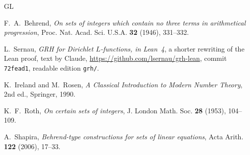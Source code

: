 \documentclass[reqno]{amsart}
\theoremstyle{definition}
\theoremstyle{plain}
\begin{document}
\begin{thebibliography}{GL}

F.~A.~Behrend, \emph{On sets of integers which contain no three terms in arithmetical progression}, Proc. Nat. Acad. Sci. U.S.A. \textbf{32} (1946), 331--332.

 L.~Sernau, \emph{GRH for Dirichlet \(L\)-functions, in Lean~4}, a shorter rewriting of the Lean proof, text by Claude, \url{https://github.com/lsernau/grh-lean}, commit \texttt{72fead1}, readable edition \texttt{grh/}.

K.~Ireland and M.~Rosen, \emph{A Classical Introduction to Modern Number Theory}, 2nd ed., Springer, 1990.

K.~F.~Roth, \emph{On certain sets of integers}, J. London Math. Soc. \textbf{28} (1953), 104--109.

A.~Shapira, \emph{Behrend-type constructions for sets of linear equations}, Acta Arith. \textbf{122} (2006), 17--33.

\end{thebibliography}
\end{document}
